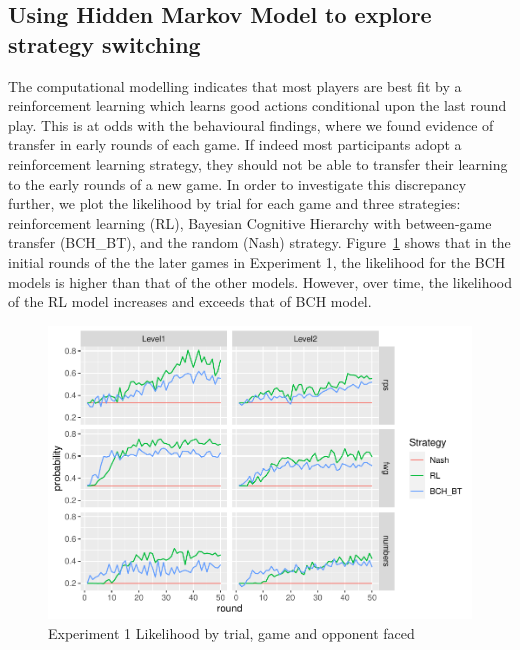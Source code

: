 \documentclass[english,man,floatsintext]{apa6}
\begin{document}
\hypertarget{using-hidden-markov-model-to-explore-strategy-switching}{%
\subsection{Using Hidden Markov Model to explore strategy switching}\label{using-hidden-markov-model-to-explore-strategy-switching}}

The computational modelling indicates that most players are best fit by a reinforcement learning which learns good actions conditional upon the last round play. This is at odds with the behavioural findings, where we found evidence of transfer in early rounds of each game. If indeed most participants adopt a reinforcement learning strategy, they should not be able to transfer their learning to the early rounds of a new game. In order to investigate this discrepancy further, we plot the likelihood by trial for each game and three strategies: reinforcement learning (RL), Bayesian Cognitive Hierarchy with between-game transfer (BCH\_BT), and the random (Nash) strategy. Figure~\ref{fig:exp1-lik-by-tr} shows that in the initial rounds of the the later games in Experiment 1, the likelihood for the BCH models is higher than that of the other models. However, over time, the likelihood of the RL model increases and exceeds that of BCH model.

\begin{figure}

{\centering \includegraphics{paper_draft_2021_files/figure-latex/exp1-lik-by-tr-1} 

}

\caption{Experiment 1 Likelihood by trial, game and opponent faced}\label{fig:exp1-lik-by-tr}
\end{figure}
\end{document}

